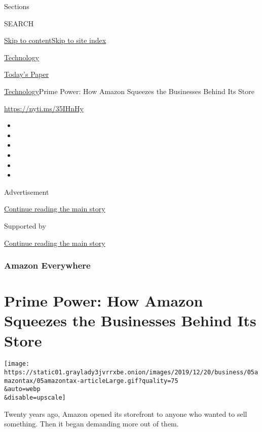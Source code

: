 Sections

SEARCH

\protect\hyperlink{site-content}{Skip to
content}\protect\hyperlink{site-index}{Skip to site index}

\href{https://www.nytimes3xbfgragh.onion/section/technology}{Technology}

\href{https://myaccount.nytimes3xbfgragh.onion/auth/login?response_type=cookie\&client_id=vi}{}

\href{https://www.nytimes3xbfgragh.onion/section/todayspaper}{Today's
Paper}

\href{/section/technology}{Technology}\textbar{}Prime Power: How Amazon
Squeezes the Businesses Behind Its Store

\href{https://nyti.ms/35IHnHy}{https://nyti.ms/35IHnHy}

\begin{itemize}
\item
\item
\item
\item
\item
\item
\end{itemize}

Advertisement

\protect\hyperlink{after-top}{Continue reading the main story}

Supported by

\protect\hyperlink{after-sponsor}{Continue reading the main story}

\hypertarget{amazon-everywhere}{%
\subsubsection{Amazon Everywhere}\label{amazon-everywhere}}

\hypertarget{prime-power-how-amazon-squeezes-the-businesses-behind-its-store}{%
\section{Prime Power: How Amazon Squeezes the Businesses Behind Its
Store}\label{prime-power-how-amazon-squeezes-the-businesses-behind-its-store}}

\texttt{[image: https://static01.graylady3jvrrxbe.onion/images/2019/12/20/business/05amazontax/05amazontax-articleLarge.gif?quality=75\\\&auto=webp\\\&disable=upscale]}

Twenty years ago, Amazon opened its storefront to anyone who wanted to
sell something. Then it began demanding more out of them.

